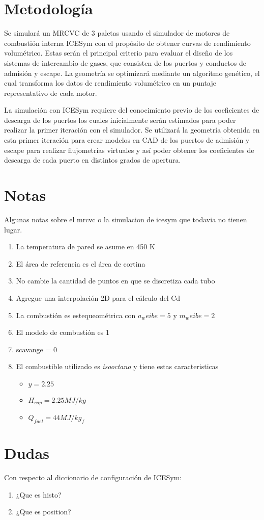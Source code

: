 \section{Metodología}
%
Se simulará un MRCVC de 3 paletas usando el simulador de motores de combustión
interna ICESym \cite{icesym} con el propósito de obtener curvas de rendimiento
volumétrico.
%
Estas serán el principal criterio para evaluar el diseño de los sistemas de
intercambio de gases, que consisten de los puertos y conductos de admisión y
escape.
%
La geometría se optimizará mediante un algoritmo genético, el cual transforma
los datos de rendimiento volumétrico en un puntaje representativo de cada
motor.


La simulación con ICESym requiere del conocimiento previo de los coeficientes
de descarga de los puertos los cuales inicialmente serán estimados para poder
realizar la primer iteración con el simulador.
%
Se utilizará la geometría obtenida en esta primer iteración para crear modelos
en CAD de los puertos de admisión y escape para realizar flujometrías virtuales
y así poder obtener los coeficientes de descarga de cada puerto en distintos
grados de apertura.




\section{Notas}
Algunas notas sobre el mrcvc o la simulacion de icesym que todavia no tienen
lugar.

\begin{enumerate}
    \item La temperatura de pared se asume en 450 K
    \item El área de referencia es el área de cortina
    \item No cambie la cantidad de puntos en que se discretiza cada tubo
    \item Agregue una interpolación 2D para el cálculo del Cd
    \item La combustión es estequeométrica con $a_weibe=5$ y $m_weibe=2$
    \item El modelo de combustión es 1
    \item scavange = 0
    \item El combustible utilizado es \emph{isooctano} y tiene estas
        caracteristicas 
        \begin{itemize}
            \item $y = 2.25$
            \item $H_{vap} = 2.25 MJ/kg$
            \item $Q_{fuel} = 44 MJ/kg_f$
        \end{itemize}
\end{enumerate}

\section{Dudas}
Con respecto al diccionario de configuración de ICESym:

\begin{enumerate}
    \item ¿Que es histo?
    \item ¿Que es position?
\end{enumerate}

